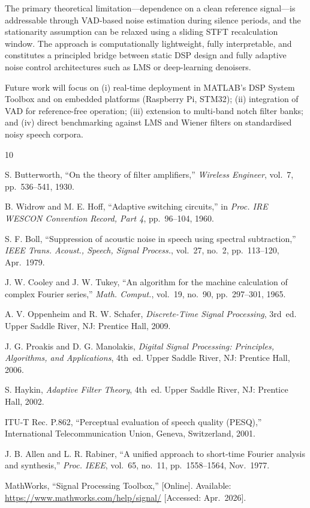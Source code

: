 \documentclass[conference]{IEEEtran}
\begin{document}
The primary theoretical limitation---dependence on a clean reference
signal---is addressable through VAD-based noise estimation during silence
periods, and the stationarity assumption can be relaxed using a sliding STFT
recalculation window. The approach is computationally lightweight, fully
interpretable, and constitutes a principled bridge between static DSP design
and fully adaptive noise control architectures such as LMS or deep-learning
denoisers.

Future work will focus on (i) real-time deployment in MATLAB's DSP System
Toolbox and on embedded platforms (Raspberry Pi, STM32); (ii) integration
of VAD for reference-free operation; (iii) extension to multi-band notch
filter banks; and (iv) direct benchmarking against LMS and Wiener filters on
standardised noisy speech corpora.

\balance


\begin{thebibliography}{10}

S. Butterworth,
``On the theory of filter amplifiers,''
\emph{Wireless Engineer}, vol.~7, pp.~536--541, 1930.

B. Widrow and M. E. Hoff,
``Adaptive switching circuits,''
in \emph{Proc. IRE WESCON Convention Record, Part 4},
pp.~96--104, 1960.

S. F. Boll,
``Suppression of acoustic noise in speech using spectral subtraction,''
\emph{IEEE Trans. Acoust., Speech, Signal Process.},
vol.~27, no.~2, pp.~113--120, Apr.\ 1979.

J. W. Cooley and J. W. Tukey,
``An algorithm for the machine calculation of complex Fourier series,''
\emph{Math. Comput.}, vol.~19, no.~90, pp.~297--301, 1965.

A. V. Oppenheim and R. W. Schafer,
\emph{Discrete-Time Signal Processing}, 3rd~ed.
Upper Saddle River, NJ: Prentice Hall, 2009.

J. G. Proakis and D. G. Manolakis,
\emph{Digital Signal Processing: Principles, Algorithms, and Applications},
4th~ed.
Upper Saddle River, NJ: Prentice Hall, 2006.

S. Haykin,
\emph{Adaptive Filter Theory}, 4th~ed.
Upper Saddle River, NJ: Prentice Hall, 2002.

ITU-T Rec. P.862,
``Perceptual evaluation of speech quality (PESQ),''
International Telecommunication Union, Geneva, Switzerland, 2001.

J. B. Allen and L. R. Rabiner,
``A unified approach to short-time Fourier analysis and synthesis,''
\emph{Proc. IEEE}, vol.~65, no.~11, pp.~1558--1564, Nov.\ 1977.

MathWorks,
``Signal Processing Toolbox,''
[Online]. Available: \url{https://www.mathworks.com/help/signal/}
[Accessed: Apr.\ 2026].

\end{thebibliography}
\end{document}
